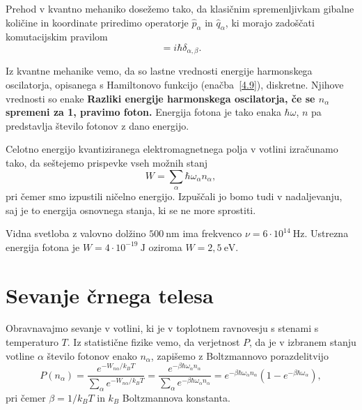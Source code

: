Prehod v kvantno mehaniko dosežemo tako, da klasičnim spremenljivkam gibalne količine
in koordinate priredimo operatorje $\hat{p}_{\alpha}$ in $\hat{q}_{\alpha}$,
ki morajo zadoščati komutacijskim pravilom 
\begin{equation}
[\hat{q}_{\alpha},\hat{p}_{\beta}]=i\hbar \delta_{\alpha, \beta}.
\label{4.10}
\end{equation}

Iz kvantne mehanike vemo, da so lastne vrednosti energije harmonskega oscilatorja, 
opisanega s Hamiltonovo funkcijo (enačba~\ref{4.9}), diskretne. Njihove vrednosti so enake
{\bf Razliki energije harmonskega oscilatorja, če se $n_{\alpha}$
spremeni za 1, pravimo foton.} Energija
fotona je tako enaka $\hbar \omega$, $n$ pa predstavlja število fotonov z dano energijo.

Celotno energijo kvantiziranega elektromagnetnega polja v votlini
izračunamo tako, da seštejemo prispevke vseh možnih stanj
\begin{equation}
W=\sum_{\alpha}\hbar\omega_{\alpha}n_{\alpha},
\end{equation}
pri čemer smo izpustili ničelno energijo. 
Izpuščali jo bomo tudi v nadaljevanju, saj
je to energija osnovnega stanja, ki se ne more sprostiti. 

\begin{remark}
Vidna svetloba z valovno dolžino $500~\si{\nano\metre}$ ima frekvenco
$\nu = 6 \cdot 10^{14}~\si{\hertz}$. Ustrezna energija fotona je
$W = 4 \cdot 10^{-19}~\si{\joule}$ oziroma $W = 2,5~\mathrm{e}\si{\volt}$.
\end{remark}

\section{Sevanje črnega telesa}
Obravnavajmo sevanje v votlini, ki je v toplotnem ravnovesju s stenami s temperaturo
$T$. Iz statistične fizike vemo, da verjetnost $P$, da je v izbranem stanju 
votline $\alpha$ število fotonov enako $n_{\alpha}$, zapišemo z Boltzmannovo porazdelitvijo
\begin{equation}
P(n_{\alpha})=\frac{e^{-W_{n\alpha}/k_BT}}{\sum_{\alpha}e^{-W_{n\alpha}/k_BT}} = 
\frac{e^{-\beta\hbar\omega_{\alpha}n_{\alpha}}}
{\sum_{\alpha}e^{-\beta\hbar\omega_{\alpha}n_{\alpha}}}=
e^{-\beta\hbar\omega_{\alpha}n_{\alpha}}(1-e^{-\beta\hbar\omega_{\alpha}}),
\label{4.12}
\end{equation}
pri čemer $\beta = 1/k_BT$ in $k_B$ Boltzmannova konstanta. 

